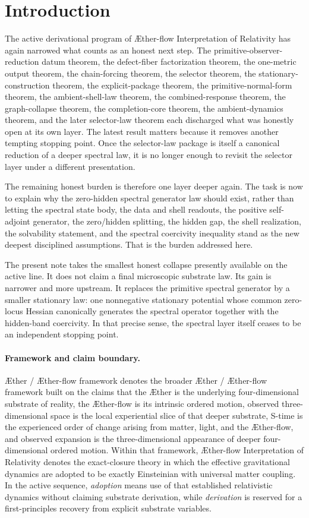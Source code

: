 \documentclass[11pt]{article}
\newcommand{\Aether}{\AE{}ther}
\newcommand{\Aflow}{\AE{}ther-flow}
\newcommand{\TheoryName}{\Aflow{} Interpretation of Relativity}
\newcommand{\TheoryProgram}{\Aether{} / \Aflow{} framework}
\begin{document}
\section{Introduction}

The active derivational program of \TheoryName{} has again narrowed what counts as an honest next step. The primitive-observer-reduction datum theorem, the defect-fiber factorization theorem, the one-metric output theorem, the chain-forcing theorem, the selector theorem, the stationary-construction theorem, the explicit-package theorem, the primitive-normal-form theorem, the ambient-shell-law theorem, the combined-response theorem, the graph-collapse theorem, the completion-core theorem, the ambient-dynamics theorem, and the later selector-law theorem each discharged what was honestly open at its own layer. The latest result matters because it removes another tempting stopping point. Once the selector-law package is itself a canonical reduction of a deeper spectral law, it is no longer enough to revisit the selector layer under a different presentation.

The remaining honest burden is therefore one layer deeper again. The task is now to explain why the zero-hidden spectral generator law should exist, rather than letting the spectral state body, the data and shell readouts, the positive self-adjoint generator, the zero/hidden splitting, the hidden gap, the shell realization, the solvability statement, and the spectral coercivity inequality stand as the new deepest disciplined assumptions. That is the burden addressed here.

The present note takes the smallest honest collapse presently available on the active line. It does not claim a final microscopic substrate law. Its gain is narrower and more upstream. It replaces the primitive spectral generator by a smaller stationary law: one nonnegative stationary potential whose common zero-locus Hessian canonically generates the spectral operator together with the hidden-band coercivity. In that precise sense, the spectral layer itself ceases to be an independent stopping point.

\paragraph{Framework and claim boundary.}
\TheoryProgram{} denotes the broader \Aether{} / \Aflow{} framework built on the claims that the \Aether{} is the underlying four-dimensional substrate of reality, the \Aflow{} is its intrinsic ordered motion, observed three-dimensional space is the local experiential slice of that deeper substrate, S-time is the experienced order of change arising from matter, light, and the \Aflow{}, and observed expansion is the three-dimensional appearance of deeper four-dimensional ordered motion. Within that framework, \TheoryName{} denotes the exact-closure theory in which the effective gravitational dynamics are adopted to be exactly Einsteinian with universal matter coupling. In the active sequence, \emph{adoption} means use of that established relativistic dynamics without claiming substrate derivation, while \emph{derivation} is reserved for a first-principles recovery from explicit substrate variables.
\end{document}
